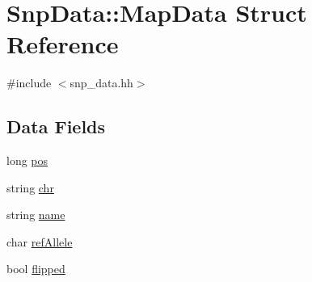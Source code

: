 \hypertarget{structSnpData_1_1MapData}{
\section{SnpData::MapData Struct Reference}
\label{structSnpData_1_1MapData}
}


{\ttfamily \#include $<$snp\_\-data.hh$>$}

\subsection*{Data Fields}
\begin{DoxyCompactItemize}
\item 
long \hyperlink{structSnpData_1_1MapData_ac44edc4ea3bb6b526aa082eb19589f5b}{pos}
\item 
string \hyperlink{structSnpData_1_1MapData_a722c6b2849f9ce664afb172617fb4cbd}{chr}
\item 
string \hyperlink{structSnpData_1_1MapData_a75420d29bffd19b97db769f345f4b4ae}{name}
\item 
char \hyperlink{structSnpData_1_1MapData_af6f9c3ab44d69c3df9230d7076929a54}{refAllele}
\item 
bool \hyperlink{structSnpData_1_1MapData_aea06cd63b1801d2f4633f48fa42510b1}{flipped}
\end{DoxyCompactItemize}


